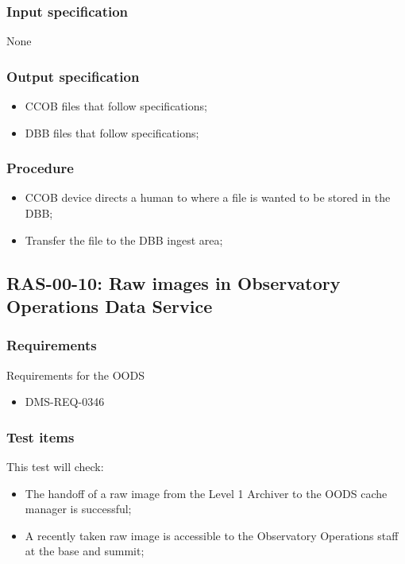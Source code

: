 \documentclass[DM,lsstdraft,STS,toc]{lsstdoc}
\begin{document}
\subsubsection{Input specification}
None
\subsubsection{Output specification}
\begin{itemize}
\item{CCOB files that follow specifications;}
\item{DBB files that follow specifications;}
\end{itemize}


\subsubsection{Procedure}
\begin{itemize}
\item{CCOB device directs a human to where a file is wanted to be stored in the DBB;}
\item{Transfer the file to the DBB ingest area; }
\end{itemize}




\subsection{RAS-00-10: Raw images in Observatory Operations Data Service}
\label{ras-00-10}
\subsubsection{Requirements}
Requirements for the OODS
\begin{itemize}
\item{DMS-REQ-0346}
\end{itemize}


\subsubsection{Test items}
This test will check:
\begin{itemize}
\item{The handoff of a raw image from the Level 1 Archiver to the OODS cache manager is successful;}
\item{A recently taken raw image is accessible to the Observatory Operations staff at the base and summit;}
\end{itemize}
\end{document}

